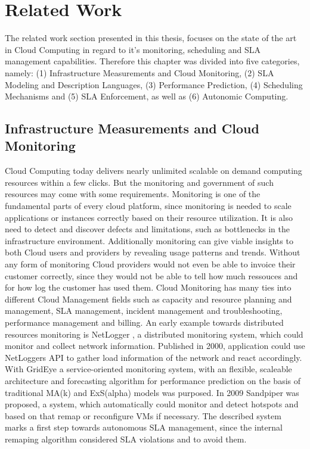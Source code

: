 
\chapter{Related Work} %
\label{Related Work} %
The related work section presented in this thesis, focuses on the state of the art in Cloud Computing in regard to it's monitoring, scheduling and SLA management capabilities. Therefore this chapter was divided into five categories, namely: (1) Infrastructure Measurements and Cloud Monitoring, (2) SLA Modeling and Description Languages, (3) Performance Prediction, (4) Scheduling Mechanisms and (5) SLA Enforcement, as well as (6) Autonomic Computing.

\section{Infrastructure Measurements and Cloud Monitoring}
Cloud Computing today delivers nearly unlimited scalable on demand computing resources within a few clicks. But the monitoring and government of such resources may come with some requirements. Monitoring is one of the fundamental parts of every cloud platform, since monitoring is needed to scale applications or instances correctly based on their resource utilization. It is also need to detect and discover defects and limitations, such as bottlenecks in the infrastructure environment. Additionally monitoring can give viable insights to both Cloud users and providers by revealing usage patterns and trends. Without any form of monitoring Cloud providers would not even be able to invoice their customer correctly, since they would not be able to tell how much ressouces and for how log the customer has used them. Cloud Monitoring has many ties into different Cloud Management fields such as capacity and resource planning and management, SLA management, incident management and troubleshooting, performance management and billing. An early example towards distributed resources monitoring is NetLogger \cite{DBLP:conf/mascots/2000}, a distributed monitoring system, which could monitor and collect network information. Published in 2000, application could use NetLoggers API to gather load information of the network and react accordingly. With GridEye \cite{Fu:2006:GSG:1170138.1170724} a service-oriented monitoring system, with an flexible, scaleable architecture and forecasting algorithm for performance prediction on the basis of traditional MA(k) and ExS(alpha) models was purposed. In 2009 Sandpiper \cite{Wood:2009:SBG:1663647.1663710} was proposed, a system, which automatically could monitor and detect hotspots and based on that remap or reconfigure VMs if necessary. The described system marks a first step towards autonomous SLA management, since the internal remaping algorithm considered SLA violations and to avoid them. 
